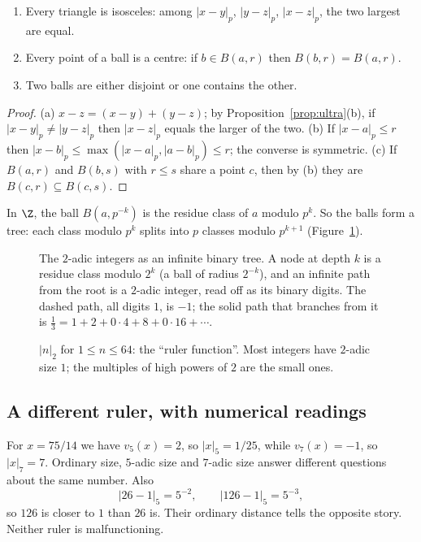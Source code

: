 \begin{proposition}\label{prop:balls}
\begin{enumerate}[label=(\alph*)]
\item Every triangle is isosceles: among $|x-y|_p$, $|y-z|_p$, $|x-z|_p$, the two largest are equal.
\item Every point of a ball is a centre: if $b\in B(a,r)$ then $B(b,r)=B(a,r)$.
\item Two balls are either disjoint or one contains the other.
\end{enumerate}
\end{proposition}
\begin{proof}
(a) $x-z=(x-y)+(y-z)$; by Proposition~\ref{prop:ultra}(b), if $|x-y|_p\ne|y-z|_p$ then $|x-z|_p$ equals the larger of the two. (b) If $|x-a|_p\le r$ then $|x-b|_p\le\max(|x-a|_p,|a-b|_p)\le r$; the converse is symmetric. (c) If $B(a,r)$ and $B(b,s)$ with $r\le s$ share a point $c$, then by (b) they are $B(c,r)\subseteq B(c,s)$.
\end{proof}

In $\Z$, the ball $B(a,p^{-k})$ is the residue class of $a$ modulo $p^k$. So the balls form a tree: each class modulo $p^k$ splits into $p$ classes modulo $p^{k+1}$ (Figure~\ref{fig:tree}).

\begin{figure}[ht]
\centering
{}
\caption{The $2$-adic integers as an infinite binary tree. A node at depth $k$ is a residue class modulo $2^k$ (a ball of radius $2^{-k}$), and an infinite path from the root is a $2$-adic integer, read off as its binary digits. The dashed path, all digits $1$, is $-1$; the solid path that branches from it is $\frac13=1+2+0\cdot4+8+0\cdot16+\cdots$.}
\label{fig:tree}
\end{figure}

\begin{figure}[ht]
\centering
{}
\caption{$|n|_2$ for $1\le n\le 64$: the ``ruler function''. Most integers have $2$-adic size $1$; the multiples of high powers of $2$ are the small ones.}
\label{fig:ruler}
\end{figure}

\subsection*{A different ruler, with numerical readings}
For $x=75/14$ we have $v_5(x)=2$, so $|x|_5=1/25$, while
$v_7(x)=-1$, so $|x|_7=7$. Ordinary size, $5$-adic size and $7$-adic size
answer different questions about the same number.
Also
\[
|26-1|_5=5^{-2},\qquad |126-1|_5=5^{-3},
\]
so $126$ is closer to $1$ than $26$ is. Their ordinary distance tells the
opposite story. Neither ruler is malfunctioning.

